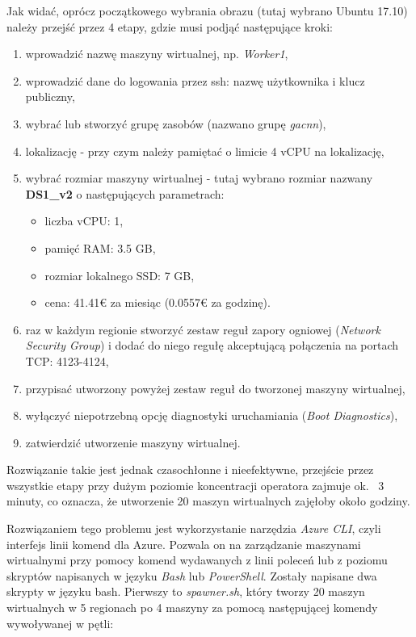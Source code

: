 Jak widać, oprócz początkowego wybrania obrazu (tutaj wybrano Ubuntu 17.10) należy przejść przez 4 etapy, gdzie musi podjąć następujące kroki:
\begin{enumerate}
  \item wprowadzić nazwę maszyny wirtualnej, np. \textit{Worker1},
  \item wprowadzić dane do logowania przez ssh: nazwę użytkownika i klucz publiczny,
  \item wybrać lub stworzyć grupę zasobów (nazwano grupę \textit{gacnn}),
  \item lokalizację - przy czym należy pamiętać o limicie 4 vCPU na lokalizację,
  \item wybrać rozmiar maszyny wirtualnej - tutaj wybrano rozmiar nazwany \textbf{DS1\_v2} o następujących parametrach:
  \begin{itemize}
    \item liczba vCPU: 1,
    \item pamięć RAM: 3.5 GB,
    \item rozmiar lokalnego SSD: 7 GB,
    \item cena: 41.41€ za miesiąc (0.0557€ za godzinę).
  \end{itemize}
  \item raz w każdym regionie stworzyć zestaw reguł zapory ogniowej (\textit{Network Security Group}) i dodać do niego regułę akceptującą połączenia na portach TCP: 4123-4124,
  \item przypisać utworzony powyżej zestaw reguł do tworzonej maszyny wirtualnej,
  \item wyłączyć niepotrzebną opcję diagnostyki uruchamiania (\textit{Boot Diagnostics}),
  \item zatwierdzić utworzenie maszyny wirtualnej.
\end{enumerate}
Rozwiązanie takie jest jednak czasochłonne i nieefektywne, przejście przez wszystkie etapy przy dużym poziomie koncentracji operatora zajmuje ok. ~3 minuty, co oznacza, że utworzenie 20 maszyn wirtualnych zajęłoby około godziny.

Rozwiązaniem tego problemu jest wykorzystanie narzędzia \textit{Azure CLI}, czyli interfejs linii komend dla Azure.
Pozwala on na zarządzanie maszynami wirtualnymi przy pomocy komend wydawanych z linii poleceń lub z poziomu skryptów napisanych w języku \textit{Bash} lub \textit{PowerShell}.
Zostały napisane dwa skrypty w języku bash.
Pierwszy to \textit{spawner.sh}, który tworzy 20 maszyn wirtualnych w 5 regionach po 4 maszyny za pomocą następującej komendy wywoływanej w pętli:\\

